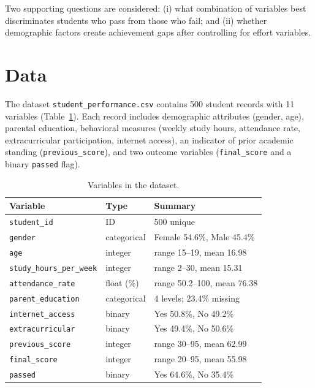 \documentclass[11pt]{article}
\begin{document}
Two supporting questions are considered: (i) what combination of variables best discriminates students who pass from those who fail; and (ii) whether demographic factors create achievement gaps after controlling for effort variables.

\section{Data}
The dataset \texttt{student\_performance.csv} contains 500 student records with 11 variables (Table~\ref{tab:vars}). Each record includes demographic attributes (gender, age), parental education, behavioral measures (weekly study hours, attendance rate, extracurricular participation, internet access), an indicator of prior academic standing (\texttt{previous\_score}), and two outcome variables (\texttt{final\_score} and a binary \texttt{passed} flag).

\begin{table}[htbp]
\centering
\small
\caption{Variables in the dataset.}
\label{tab:vars}
\begin{tabular}{lll}
\toprule
Variable & Type & Summary \\
\midrule
\texttt{student\_id}             & ID         & 500 unique \\
\texttt{gender}                  & categorical & Female 54.6\%, Male 45.4\% \\
\texttt{age}                     & integer    & range 15--19, mean 16.98 \\
\texttt{study\_hours\_per\_week} & integer    & range 2--30, mean 15.31 \\
\texttt{attendance\_rate}        & float (\%) & range 50.2--100, mean 76.38 \\
\texttt{parent\_education}       & categorical & 4 levels; 23.4\% missing \\
\texttt{internet\_access}        & binary     & Yes 50.8\%, No 49.2\% \\
\texttt{extracurricular}         & binary     & Yes 49.4\%, No 50.6\% \\
\texttt{previous\_score}         & integer    & range 30--95, mean 62.99 \\
\texttt{final\_score}            & integer    & range 20--95, mean 55.98 \\
\texttt{passed}                  & binary     & Yes 64.6\%, No 35.4\% \\
\bottomrule
\end{tabular}
\end{table}
\end{document}
